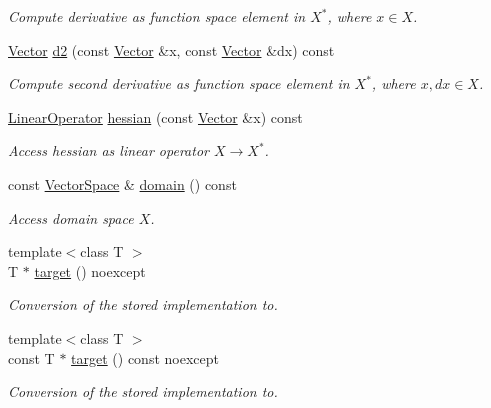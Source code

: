 \begin{DoxyCompactItemize}
\begin{DoxyCompactList}\small\item\em Compute derivative as function space element in $X^*$, where $x\in X$. \end{DoxyCompactList}\item 
\hyperlink{classSpacy_1_1Vector}{Vector} \hyperlink{classSpacy_1_1C2Functional_af2f8671e8ebb9079255afc39a495859d}{d2} (const \hyperlink{classSpacy_1_1Vector}{Vector} \&x, const \hyperlink{classSpacy_1_1Vector}{Vector} \&dx) const \hypertarget{classSpacy_1_1C2Functional_af2f8671e8ebb9079255afc39a495859d}{}\label{classSpacy_1_1C2Functional_af2f8671e8ebb9079255afc39a495859d}

\begin{DoxyCompactList}\small\item\em Compute second derivative as function space element in $X^*$, where $x,dx\in X$. \end{DoxyCompactList}\item 
\hyperlink{classSpacy_1_1LinearOperator}{Linear\+Operator} \hyperlink{classSpacy_1_1C2Functional_a97eeeb376ed178ea7e2f109967f99c24}{hessian} (const \hyperlink{classSpacy_1_1Vector}{Vector} \&x) const \hypertarget{classSpacy_1_1C2Functional_a97eeeb376ed178ea7e2f109967f99c24}{}\label{classSpacy_1_1C2Functional_a97eeeb376ed178ea7e2f109967f99c24}

\begin{DoxyCompactList}\small\item\em Access hessian as linear operator $ X \rightarrow X^* $. \end{DoxyCompactList}\item 
const \hyperlink{classSpacy_1_1VectorSpace}{Vector\+Space} \& \hyperlink{classSpacy_1_1C2Functional_ac75246c876b8bf75cdd4f1264bdb49ae}{domain} () const \hypertarget{classSpacy_1_1C2Functional_ac75246c876b8bf75cdd4f1264bdb49ae}{}\label{classSpacy_1_1C2Functional_ac75246c876b8bf75cdd4f1264bdb49ae}

\begin{DoxyCompactList}\small\item\em Access domain space $X$. \end{DoxyCompactList}\item 
{\footnotesize template$<$class T $>$ }\\T $\ast$ \hyperlink{classSpacy_1_1C2Functional_aa1b2f29e86d728629683ebafeb1aa684}{target} () noexcept
\begin{DoxyCompactList}\small\item\em Conversion of the stored implementation to. \end{DoxyCompactList}\item 
{\footnotesize template$<$class T $>$ }\\const T $\ast$ \hyperlink{classSpacy_1_1C2Functional_a26cabef07e8fe8b678d43a98cb2b41e9}{target} () const noexcept
\begin{DoxyCompactList}\small\item\em Conversion of the stored implementation to. \end{DoxyCompactList}\end{DoxyCompactItemize}


